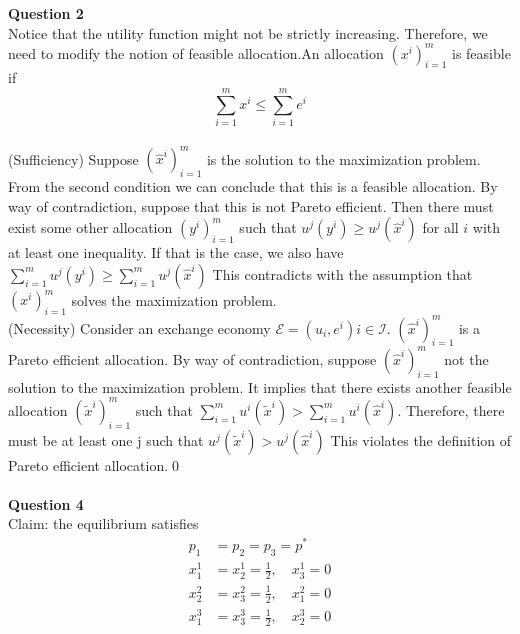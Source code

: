 \documentclass[letterpaper,12pt]{article}
\theoremstyle{definition}
\begin{document}
\noindent\textbf{Question 2}\\
Notice that the utility function might not be strictly increasing. Therefore, we need to modify the notion of feasible allocation.An allocation $(x^i)_{i=1}^{m}$ is feasible if $$\sum _ { i = 1 } ^ { m } x ^ { i } \leq \sum_{i=1}^{m} e^i $$\\
(Sufficiency) Suppose  $( \hat { x } ^ { i } ) _ { i = 1 } ^ { m }$ is the solution to the maximization problem. From the second condition we can conclude that this is a feasible allocation. By way of contradiction, suppose that this is not Pareto efficient. Then there must exist some other allocation $(y^i)_{i=1}^{m}$ such that $u^j\left(y^i\right) \geq u^j\left(\hat{x}^i\right) $ for all $i$ with at least one inequality. If that is the case, we also have   $\sum_{i=1}^{m} u^j\left(y^i\right) \geq \sum_{i=1}^{m} u^j\left(\hat{x}^i\right) $ This contradicts with the assumption that $(x^i)_{i=1}^{m}$ solves the maximization problem.\\
(Necessity) Consider an exchange economy $\mathcal { E } = \left( u _ { i }  , e ^ { i } \right){ i \in \mathcal { I } }$. $\left( \hat { x } ^ { i } \right) _ { i = 1 } ^ { m }$ is a Pareto efficient allocation. By way of contradiction, suppose $( \hat { x } ^ { i } ) _ { i = 1 } ^ { m }$ not the solution to the maximization problem. It implies that there exists another feasible allocation $( \tilde { x } ^ { i } ) _ { i = 1 } ^ { m }$ such that $\sum _ { i = 1 } ^ { m } u ^ { i } \left( \tilde { x } ^ { i } \right) > \sum _ { i = 1 } ^ { m } u ^ { i } \left( \hat { x } ^ { i } \right)$. Therefore, there must be at least one j such that $u^j\left(\tilde{x}^i\right) > u^j\left(\hat{x}^i\right) $ This violates the definition of Pareto efficient allocation.\qed\\
\\
\vspace{5mm}
\noindent\textbf{Question 4}\\
Claim: the equilibrium satisfies
\begin{equation}
    \begin{aligned} 
    p_1 &= p_2 = p_3= p^*\\
    x _ { 1 } ^ { 1 } & = x _ { 2 } ^ { 1 } = \frac { 1 } { 2 } ,\quad x _ { 3 } ^ { 1 } = 0 \\ 
    x _ { 2 } ^ { 2 } & = x _ { 3 } ^ { 2 } = \frac { 1 } { 2 } ,\quad x _ { 1 } ^ { 2 } = 0 \\
    x _ { 1 } ^ { 3 } & = x _ { 3 } ^ { 3 } = \frac { 1 } { 2 } ,\quad x _ { 2 } ^ { 3 } = 0 \end{aligned}
\end{equation}
\end{document}
